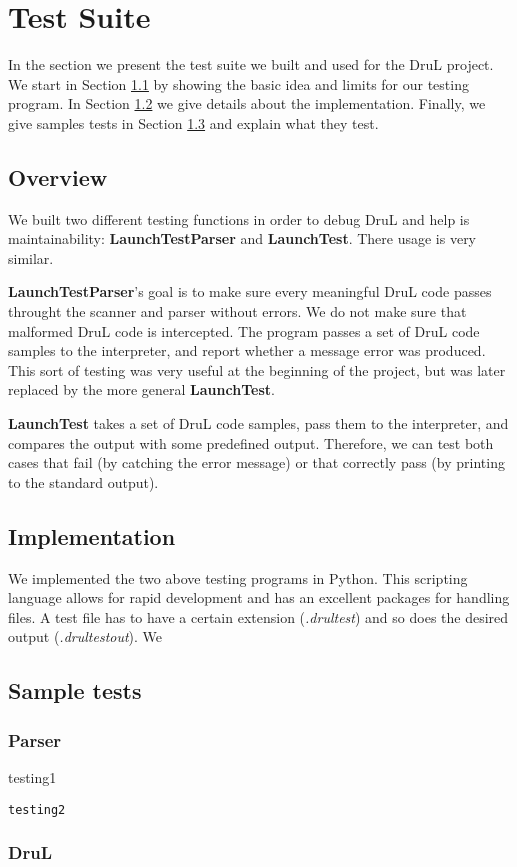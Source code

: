 

\section{Test Suite}
In the section we present the test suite we built and used for the DruL 
project. We start in Section \ref{ts:overview} by showing the basic idea
and limits for our testing program. In Section \ref{ts:implem} we give details
about the implementation. Finally, we give samples tests in 
Section \ref{ts:samples} and explain what they test.



\subsection{Overview} \label{ts:overview}
We built two different testing functions in order to debug DruL and help is
maintainability: \textbf{LaunchTestParser} and \textbf{LaunchTest}. There
usage is very similar.

\textbf{LaunchTestParser}'s goal is to make sure every meaningful DruL code
passes throught the scanner and parser without errors. We do not make sure
that malformed DruL code is intercepted. The program passes a set of DruL code
samples to the interpreter, and report whether a message error was produced.
This sort of testing was very useful at the beginning of the project, but
was later replaced by the more general \textbf{LaunchTest}.

\textbf{LaunchTest} takes a set of DruL code samples, pass them to the
interpreter, and compares the output with some predefined output. Therefore,
we can test both cases that fail (by catching the error message) or that
correctly pass (by printing to the standard output).


\subsection{Implementation} \label{ts:implem}
We implemented the two above testing programs in Python. This scripting
language allows for rapid development and has an excellent packages for
handling files. A test file has to have a certain extension (\textit{.drultest})
and so does the desired output (\textit{.drultestout}).
We 





\subsection{Sample tests} \label{ts:samples}


\subsubsection{Parser}

{\color{red}
testing1
}

{\color{blue}
\begin{verbatim}
testing2
\end{verbatim}
}


\subsubsection{DruL}


